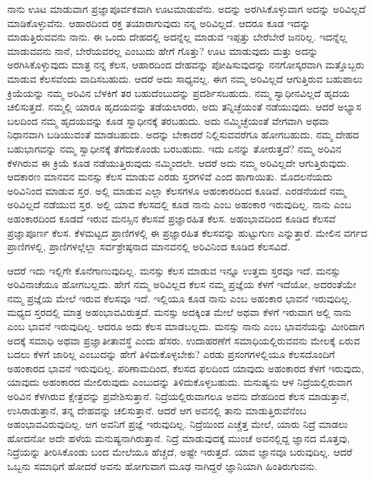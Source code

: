 \vskip 5pt

ನಾನು ಊಟ ಮಾಡುವಾಗ ಪ್ರಜ್ಞಾಪೂರ್ವಕವಾಗಿ ಊಟಮಾಡುವೆನು. ಅದನ್ನು ಅರಗಿಸಿಕೊಳ್ಳುವಾಗ ಅದನ್ನು ಅರಿವಿಲ್ಲದೆ ಮಾಡಿಕೊಳ್ಳುವೆನು. ಆಹಾರದಿಂದ ರಕ್ತ ತಯಾರಾಗುವುದು ನನ್ನ ಅರಿವಿಲ್ಲದೆ. ಆದರೂ ಕೂಡ ಇದನ್ನು ಮಾಡುತ್ತಿರುವವನು ನಾನು. ಈ ಒಂದು ದೇಹದಲ್ಲಿ ಅದನ್ನೆಲ್ಲ ಮಾಡುವ ಇಪ್ಪತ್ತು ಬೇರೆಬೇರೆ ಜನರಿಲ್ಲ. ಇದನ್ನೆಲ್ಲ ಮಾಡುವವನು ನಾನೆ, ಬೇರೆಯವರಲ್ಲ ಎಂಬುದು ಹೇಗೆ ಗೊತ್ತು? ಊಟ ಮಾಡುವುದು ಮತ್ತು ಅದನ್ನು ಅರಗಿಸಿಕೊಳ್ಳುವುದು ಮಾತ್ರ ನನ್ನ ಕೆಲಸ, ಆಹಾರದಿಂದ ದೇಹವನ್ನು ಪೋಷಿಸುವುದನ್ನು ನನಗೋಸ್ಕರವಾಗಿ ಮತ್ತೊಬ್ಬರು ಮಾಡುವ ಕೆಲಸವೆಂದು ವಾದಿಸಬಹುದು. ಆದರೆ ಅದು ಸಾಧ್ಯವಲ್ಲ. ಈಗ ನಮ್ಮ ಅರಿವಿಲ್ಲದೆ ಆಗುತ್ತಿರುವ ಬಹುಪಾಲು ಕ್ರಿಯೆಯನ್ನು ನಮ್ಮ ಅರಿವಿನ ಬೆಳಕಿಗೆ ತರ ಬಹುದೆಂಬುದನ್ನು ಪ್ರದರ್ಶಿಸಬಹುದು. ನಮ್ಮ ಸ್ವಾಧೀನವಿಲ್ಲದೆ ಹೃದಯ ಚಲಿಸುತ್ತದೆ. ನಮ್ಮಲ್ಲಿ ಯಾರೂ ಹೃದಯವನ್ನು ತಡೆಯಲಾರರು, ಅದು ತನ್ನಿಚ್ಛೆಯಂತೆ ನಡೆಯುವುದು. ಆದರೆ ಅಭ್ಯಾಸ ಬಲದಿಂದ ನಮ್ಮ ಹೃದಯವನ್ನು ಕೂಡ ಸ್ವಾಧೀನಕ್ಕೆ ತರಬಹುದು. ಅದು ನಮ್ಮಿಚ್ಛೆಯಂತೆ ವೇಗವಾಗಿ ಅಥವಾ ನಿಧಾನವಾಗಿ ಬಡಿಯುವಂತೆ ಮಾಡಬಹುದು. ಅದನ್ನು ಬೇಕಾದರೆ ನಿಲ್ಲಿಸುವವರೆಗೂ ಹೋಗಬಹುದು. ನಮ್ಮ ದೇಹದ ಬಹುಭಾಗವನ್ನು ನಮ್ಮ ಸ್ವಾಧೀನಕ್ಕೆ ತೆಗೆದುಕೊಂಡು ಬರಬಹುದು. ಇದು ಏನನ್ನು ತೋರುತ್ತದೆ? ನಮ್ಮ ಅರಿವಿನ ಕೆಳಗಿರುವ ಈ ಕ್ರಿಯೆ ಕೂಡ ನಡೆಯುತ್ತಿರುವುದು ನಮ್ಮಿಂದಲೇ. ಆದರೆ ಅದು ನಮ್ಮ ಅರಿವಿಲ್ಲದೇ ಆಗುತ್ತಿರುವುದು. ಆದಕಾರಣ ಮಾನವನ ಮನಸ್ಸು ಕೆಲಸ ಮಾಡುವ ಎರಡು ಸ್ತರಗಳಿವೆ ಎಂದ ಹಾಗಾಯಿತು. ಮೊದಲನೆಯದು ಅರಿವಿನಿಂದ ಮಾಡುವ ಸ್ತರ. ಅಲ್ಲಿ ಮಾಡುವ ಎಲ್ಲಾ ಕೆಲಸಗಳೂ ಅಹಂಕಾರದಿಂದ ಕೂಡಿವೆ. ಎರಡನೆಯದೆ ನಮ್ಮ ಅರಿವಿಲ್ಲದೆ ನಡೆಯುವ ಸ್ತರ. ಅಲ್ಲಿ ಯಾವ ಕೆಲಸದಲ್ಲಿ ಕೂಡ ನಾನು ಎಂಬ ಅಹಂಕಾರ ಇರುವುದಿಲ್ಲ. ನಾನು ಎಂಬ ಅಹಂಕಾರದಿಂದ ಕೂಡದೆ ಇರುವ ಮನಸ್ಸಿನ ಕೆಲಸವೆ ಪ್ರಜ್ಞಾರಹಿತ ಕೆಲಸ. ಅಹಂಭಾವದಿಂದ ಕೂಡಿದ ಕೆಲಸವೆ ಪ್ರಜ್ಞಾಪೂರ್ಣ ಕೆಲಸ. ಕೆಳಮಟ್ಟದ ಪ್ರಾಣಿಗಳಲ್ಲಿ ಈ ಪ್ರಜ್ಞಾರಹಿತ ಕೆಲಸವನ್ನು ಹುಟ್ಟುಗುಣ ಎನ್ನುತ್ತಾರೆ. ಮೇಲಿನ ವರ್ಗದ ಪ್ರಾಣಿಗಳಲ್ಲಿ, ಪ್ರಾಣಿಗಳಲ್ಲೆಲ್ಲಾ ಸರ್ವಶ್ರೇಷ್ಠನಾದ ಮಾನವನಲ್ಲಿ ಅರಿವಿನಿಂದ ಕೂಡಿದ ಕೆಲಸವಿದೆ. 

\vskip 5pt

ಆದರೆ ಇದು ಇಲ್ಲಿಗೇ ಕೊನೆಗಾಣುವುದಿಲ್ಲ. ಮನಸ್ಸು ಕೆಲಸ ಮಾಡುವ ಇನ್ನೂ ಉತ್ತಮ ಸ್ತರವೂ ಇದೆ. ಮನಸ್ಸು ಅರಿವಿನಾಚೆಯೂ ಹೋಗಬಲ್ಲದು. ಹೇಗೆ ನಮ್ಮ ಅರಿವಿಲ್ಲದ ಕೆಲಸ ನಮ್ಮ ಪ್ರಜ್ಞೆಯ ಕೆಳಗೆ ಇದೆಯೋ, ಅದರಂತೆಯೇ ನಮ್ಮ ಪ್ರಜ್ಞೆಯ ಮೇಲೆ ಇರುವ ಕೆಲಸವೂ ಇದೆ. ಇಲ್ಲಿಯೂ ಕೂಡ ನಾನು ಎಂಬ ಅಹಂಕಾರ ಭಾವನೆ ಇರುವುದಿಲ್ಲ. ಮಧ್ಯದ ಸ್ತರದಲ್ಲಿ ಮಾತ್ರ ಅಹಂಭಾವವಿರುತ್ತದೆ. ಮನಸ್ಸು ಅದಕ್ಕಿಂತ ಮೇಲೆ ಅಥವಾ ಕೆಳಗೆ ಇರುವಾಗ ಅಲ್ಲಿ ನಾನು ಎಂಬ ಭಾವನೆ ಇರುವುದಿಲ್ಲ. ಆದರೂ ಅದು ಕೆಲಸ ಮಾಡಬಲ್ಲದು. ಮನಸ್ಸು ನಾನು ಎಂಬ ಭಾವನೆಯನ್ನು ಮೀರಿದಾಗ ಅದಕ್ಕೆ ಸಮಾಧಿ ಅಥವಾ ಪ್ರಜ್ಞಾತೀತಾವಸ್ಥೆ ಎಂದು ಹೆಸರು. ಉದಾಹರಣೆಗೆ ಸಮಾಧಿಯಲ್ಲಿರುವವನು ಮೇಲಕ್ಕೆ ಏರುವ ಬದಲು ಕೆಳಗೆ ಜಾರಿಲ್ಲ ಎಂಬುದನ್ನು ಹೇಗೆ ತಿಳಿದುಕೊಳ್ಳಬೇಕು? ಎರಡು ಪ್ರಸಂಗಗಳಲ್ಲಿಯೂ ಕೆಲಸದೊಂದಿಗೆ ಅಹಂಕಾರದ ಭಾವನೆ ಇರುವುದಿಲ್ಲ. ಪರಿಣಾಮದಿಂದ, ಕೆಲಸದ ಫಲದಿಂದ ಯಾವುದು ಅಹಂಕಾರದ ಕೆಳಗೆ ಇರುವುದು, ಯಾವುದು ಅಹಂಕಾರದ ಮೇಲಿರುವುದು ಎಂಬುದನ್ನು ತಿಳಿದುಕೊಳ್ಳಬಹುದು. ಮನುಷ್ಯನು ಆಳ ನಿದ್ರೆಯಲ್ಲಿರುವಾಗ ಅರಿವಿನ ಕೆಳಗಿರುವ ಕ್ಷೇತ್ರವನ್ನು ಪ್ರವೇಶಿಸುತ್ತಾನೆ. ನಿದ್ರೆಯಲ್ಲಿರುವಾಗಲೂ ಅವನು ದೇಹದಿಂದ ಕೆಲಸ ಮಾಡುತ್ತಾನೆ, ಉಸಿರಾಡುತ್ತಾನೆ, ತನ್ನ ದೇಹವನ್ನು ಚಲಿಸುತ್ತಾನೆ. ಆದರೆ ಆಗ ಅವನಲ್ಲಿ ತಾನು ಮಾಡುತ್ತಿರುವೆನೆಂಬ ಅಹಂಭಾವವಿರುವುದಿಲ್ಲ. ಆಗ ಅವನಿಗೆ ಪ್ರಜ್ಞೆ ಇರುವುದಿಲ್ಲ. ನಿದ್ರೆಯಿಂದ ಎಚ್ಚೆತ್ತ ಮೇಲೆ, ಯಾರು ನಿದ್ರೆ ಮಾಡಲು ಹೋದನೋ ಅದೇ ಹಳೆಯ ಮನುಷ್ಯನಾಗಿರುತ್ತಾನೆ. ನಿದ್ರೆ ಮಾಡುವುದಕ್ಕೆ ಮುಂಚೆ ಅವನಲ್ಲಿದ್ದ ಜ್ಞಾನದ ಮೊತ್ತವು, ನಿದ್ರೆಯನ್ನು ತೀರಿಸಿಕೊಂಡು ಬಂದ ಮೇಲೆಯೂ ಹೆಚ್ಚದೆ, ಅಷ್ಟೇ ಇರುತ್ತದೆ. ಯಾವ ಜ್ಞಾನವೂ ಬರುವುದಿಲ್ಲ. ಆದರೆ ಒಬ್ಬನು ಸಮಾಧಿಗೆ ಹೋದರೆ ಅವನು ಹೋಗುವಾಗ ಮೂಢ ನಾಗಿದ್ದರೆ ಜ್ಞಾನಿಯಾಗಿ ಹಿಂತಿರುಗುವನು. 

